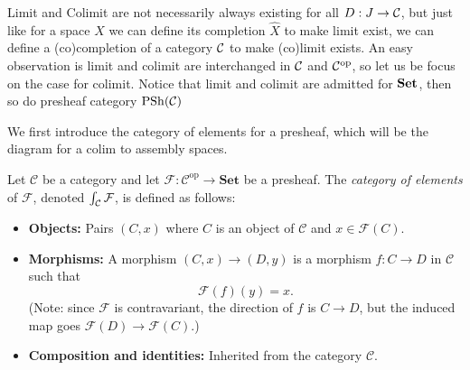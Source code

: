 Limit and Colimit are not necessarily always existing for all $D:J\to\mathcal{C}$, but just like for a space $X$ we can define its completion $\hat{X}$ to make limit exist, we can define a (co)completion of a category $\mathcal{C}$ to make (co)limit exists. An easy observation is limit and colimit are interchanged in $\mathcal{C}$ and $\mathcal{C}^{\mathrm{op}}$, so let us be focus on the case for colimit. Notice that limit and colimit are admitted for $\mathbf{Set}$, then so do presheaf category $\mathrm{PSh}(\mathcal{C})$

We first introduce the category of elements for a presheaf, which will be the diagram for a colim to assembly spaces.
\begin{definition}
  Let $\mathcal{C}$ be a category and let $\mathcal{F} : \mathcal{C}^{\mathrm{op}} \to \mathbf{Set}$ be a presheaf. The \emph{category of elements} of $\mathcal{F}$, denoted $\int_{\mathcal{C}} \mathcal{F}$, is defined as follows:

\begin{itemize}
    \item \textbf{Objects:} Pairs $(C, x)$ where $C$ is an object of $\mathcal{C}$ and $x \in \mathcal{F}(C)$.
    \item \textbf{Morphisms:} A morphism $(C, x) \to (D, y)$ is a morphism $f : C \to D$ in $\mathcal{C}$ such that
    \[
    \mathcal{F}(f)(y) = x.
    \]
    (Note: since $\mathcal{F}$ is contravariant, the direction of $f$ is $C \to D$, but the induced map goes $\mathcal{F}(D) \to \mathcal{F}(C)$.)

    \item \textbf{Composition and identities:} Inherited from the category $\mathcal{C}$.
\end{itemize}
\end{definition}

